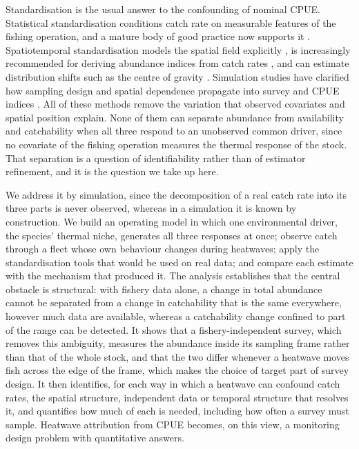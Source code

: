 \documentclass[11pt,a4paper]{article}
\begin{document}
Standardisation is the usual answer to the confounding of nominal CPUE. Statistical standardisation conditions catch rate on measurable features of the fishing operation, and a mature body of good practice now supports it \citep{maunder2004,hoyle2024}. Spatiotemporal standardisation models the spatial field explicitly \citep{thorson2015,thorson2017,thorson2019}, is increasingly recommended for deriving abundance indices from catch rates \citep{maunder2020,thorson2020}, and can estimate distribution shifts such as the centre of gravity \citep{thorson2016a}. Simulation studies have clarified how sampling design and spatial dependence propagate into survey and CPUE indices \citep{fuster2024}. All of these methods remove the variation that observed covariates and spatial position explain. None of them can separate abundance from availability and catchability when all three respond to an unobserved common driver, since no covariate of the fishing operation measures the thermal response of the stock. That separation is a question of identifiability rather than of estimator refinement, and it is the question we take up here.

We address it by simulation, since the decomposition of a real catch rate into its three parts is never observed, whereas in a simulation it is known by construction. We build an operating model in which one environmental driver, the species' thermal niche, generates all three responses at once; observe catch through a fleet whose own behaviour changes during heatwaves; apply the standardisation tools that would be used on real data; and compare each estimate with the mechanism that produced it. The analysis establishes that the central obstacle is structural: with fishery data alone, a change in total abundance cannot be separated from a change in catchability that is the same everywhere, however much data are available, whereas a catchability change confined to part of the range can be detected. It shows that a fishery-independent survey, which removes this ambiguity, measures the abundance inside its sampling frame rather than that of the whole stock, and that the two differ whenever a heatwave moves fish across the edge of the frame, which makes the choice of target part of survey design. It then identifies, for each way in which a heatwave can confound catch rates, the spatial structure, independent data or temporal structure that resolves it, and quantifies how much of each is needed, including how often a survey must sample. Heatwave attribution from CPUE becomes, on this view, a monitoring design problem with quantitative answers.
\end{document}
